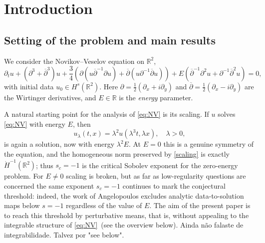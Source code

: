 \documentclass[a4paper,
11pt,  reqno]{amsart}
\newcommand{\blue}{\color{blue}}
\newcommand{\orange}{\color{orange}}
\newcommand{\5}{\textup{V}}
\theoremstyle{remark}
\newcommand{\R}{\mathbb{R}}
\numberwithin{equation}{section}
\numberwithin{theorem}{section}
\begin{document}
\section{Introduction}

\subsection{Setting of the problem and main results}

We consider the Novikov--Veselov equation on $\R^2$,
\begin{equation}\tag{NV}\label{eq:NV}
		\partial_t u + (\partial^3 + \overline{\partial}^3)u + \frac34(\partial(u\overline{\partial}^{-1}\partial u) + \overline{\partial}(u\partial^{-1}\overline{\partial}u)) + E(\overline{\partial}^{-1}\partial^2 u + \partial^{-1}\overline{\partial}^2 u)=0,
\end{equation}
with initial data $u_0\in H^s(\R^2)$. Here $\partial=\tfrac12(\partial_x+i\partial_y)$ and $\overline{\partial}=\tfrac12(\partial_x-i\partial_y)$ are the Wirtinger derivatives, and $E\in\R$ is the \emph{energy} parameter.

\medskip

A natural starting point for the analysis of \eqref{eq:NV} is its scaling. If $u$ solves \eqref{eq:NV} with energy $E$, then
\begin{equation}\label{scaling}
u_\lambda(t,x)=\lambda^2u(\lambda^3t,\lambda x),\quad \lambda>0,
\end{equation}
is again a solution, now with energy $\lambda^2E$. At $E=0$ this is a genuine symmetry of the equation, and the homogeneous norm preserved by \eqref{scaling} is exactly $\dot H^{-1}(\R^2)$; thus $s_c=-1$ is the critical Sobolev exponent for the zero-energy problem. For $E\neq 0$ scaling is broken, but as far as low-regularity questions are concerned the same exponent $s_c=-1$ continues to mark the conjectural threshold: indeed, the work of Angelopoulos \cite{angelopolous} excludes analytic data-to-solution maps below $s=-1$ regardless of the value of $E$. The aim of the present paper is to reach this threshold by perturbative means, that is, without appealing to the integrable structure of \eqref{eq:NV}{\orange\ (see the overview below)}. {\blue Ainda não falaste de integrabilidade. Talvez por "see below".}

\medskip
\end{document}
